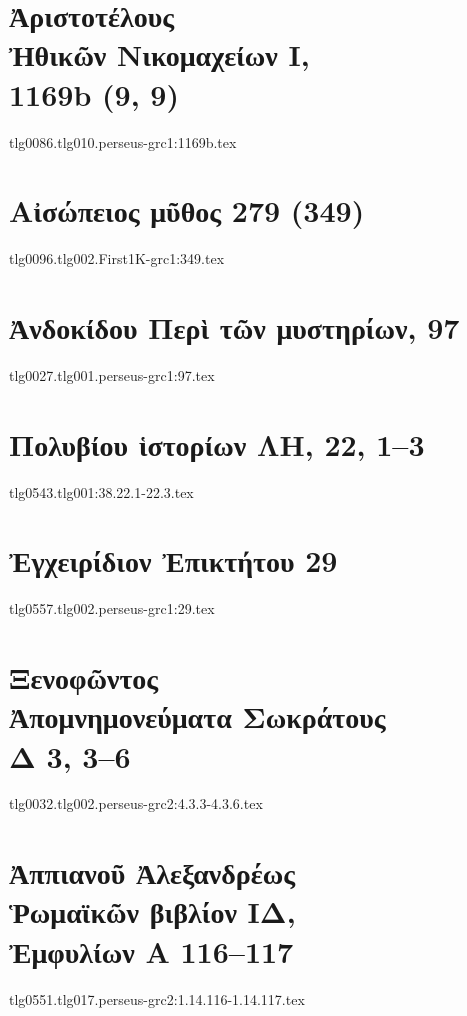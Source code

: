 \documentclass[a4paper,12pt,twoside]{report}
\begin{document}
\chapter[Ἀριστοτέλους Ἠθικῶν Νικομαχείων Ι]{\textgreek[variant=ancient]{Ἀριστοτέλους \\Ἠθικῶν Νικομαχείων Ι,} \\1169b (9, 9)}
{tlg0086.tlg010.perseus-grc1:1169b.tex}
\chapter[Αἰσώπειος μῦθος 279]{\textgreek[variant=ancient]{Αἰσώπειος μῦθος} 279 (349)}
{tlg0096.tlg002.First1K-grc1:349.tex}

\chapter[Ἀνδοκίδου Περὶ τῶν μυστηρίων]{\textgreek[variant=ancient]{Ἀνδοκίδου Περὶ τῶν μυστηρίων,} 97}
\label{chap:andocides}
{tlg0027.tlg001.perseus-grc1:97.tex}
\chapter[Πολυβίου Ἱστορίων ΛΗ]{\textgreek[variant=ancient]{Πολυβίου ἱστορίων ΛΗ,} 22, 1–3}
{tlg0543.tlg001:38.22.1-22.3.tex}
%
\chapter[Ἐγχειρίδιον Ἐπικτήτου 29]{\textgreek[variant=ancient]{Ἐγχειρίδιον Ἐπικτήτου} 29}
{tlg0557.tlg002.perseus-grc1:29.tex}

\chapter[Ξενοφῶντος Ἀπομνημονεύματα Σωκράτους]{\textgreek[variant=ancient]{Ξενοφῶντος \\Ἀπομνημονεύματα Σωκράτους \\Δ} 3, 3–6}
{tlg0032.tlg002.perseus-grc2:4.3.3-4.3.6.tex}
%
\chapter[Ἀππιανοῦ Ῥωμαϊκῶν ΙΔ]{\textgreek[variant=ancient]{Ἀππιανοῦ Ἀλεξανδρέως \\Ῥωμαϊκῶν βιβλίον ΙΔ, \\Ἐμφυλίων Α} 116–117}
{tlg0551.tlg017.perseus-grc2:1.14.116-1.14.117.tex}
\end{document}
